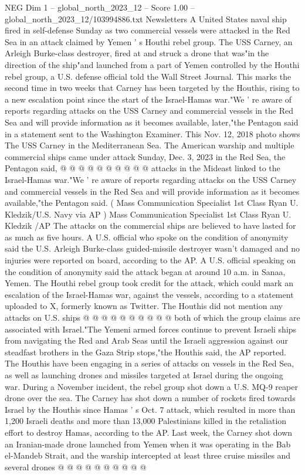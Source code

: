 \begin{textsample}{NEG Dim 1 – global\_north\_2023\_12 – Score 1.00 – global\_north\_2023\_12/103994886.txt}  \label{ex:f1_neg_368}
Newsletters A United States naval ship fired in self-defense Sunday as two commercial vessels were attacked in the Red Sea in an attack claimed by Yemen ' s Houthi rebel group.
The USS Carney, an Arleigh Burke-class destroyer, fired at and struck a drone that was"in the direction of the ship"and launched from a part of Yemen controlled by the Houthi rebel group, a U.S. defense official told the Wall Street Journal.
This marks the second time in two weeks that Carney has been targeted by the Houthis, rising to a new escalation point since the start of the Israel-Hamas war."We ' re aware of reports regarding attacks on the USS Carney and commercial vessels in the Red Sea and will provide information as it becomes available, later,"the Pentagon said in a statement sent to the Washington Examiner.
This Nov. 12, 2018 photo shows The USS Carney in the Mediterranean Sea.
The American warship and multiple commercial ships came under attack Sunday, Dec. 3, 2023 in the Red Sea, the Pentagon said, @ @ @ @ @ @ @ @ @ @ attacks in the Mideast linked to the Israel-Hamas war."We ' re aware of reports regarding attacks on the USS Carney and commercial vessels in the Red Sea and will provide information as it becomes available,"the Pentagon said. ( Mass Communication Specialist 1st Class Ryan U.
Kledzik/U.S.
Navy via AP ) Mass Communication Specialist 1st Class Ryan U.
Kledzik /AP The attacks on the commercial ships are believed to have lasted for as much as five hours.
A U.S. official who spoke on the condition of anonymity said the U.S.
Arleigh Burke-class guided-missile destroyer wasn't damaged and no injuries were reported on board, according to the AP.
A U.S. official speaking on the condition of anonymity said the attack began at around 10 a.m. in Sanaa, Yemen.
The Houthi rebel group took credit for the attack, which could mark an escalation of the Israel-Hamas war, against the vessels, according to a statement uploaded to X, formerly known as Twitter.
The Houthis did not mention any attacks on U.S. ships @ @ @ @ @ @ @ @ @ @ both of which the group claims are associated with Israel."The Yemeni armed forces continue to prevent Israeli ships from navigating the Red and Arab Seas until the Israeli aggression against our steadfast brothers in the Gaza Strip stops,"the Houthis said, the AP reported.
The Houthis have been engaging in a series of attacks on vessels in the Red Sea, as well as launching drones and missiles targeted at Israel during the ongoing war.
During a November incident, the rebel group shot down a U.S.
MQ-9 reaper drone over the sea.
The Carney has shot down a number of rockets fired towards Israel by the Houthis since Hamas ' s Oct. 7 attack, which resulted in more than 1,200 Israeli deaths and more than 13,000 Palestinians killed in the retaliation effort to destroy Hamas, according to the AP.
Last week, the Carney shot down an Iranian-made drone launched from Yemen when it was operating in the Bab el-Mandeb Strait, and the warship intercepted at least three cruise missiles and several drones @ @ @ @ @ @ @ @ @ @

\end{textsample}
